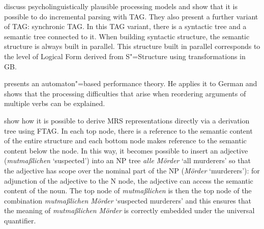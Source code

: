 \citet{SJ93a} discuss psycholinguistically plausible processing models and show that it is possible to do incremental parsing with TAG. They also present a
further variant of TAG: synchronic TAG\indexstag. In this TAG variant, there is a syntactic tree and a semantic tree connected to it.
When building syntactic structure, the semantic structure is always built in parallel. This structure built in parallel corresponds to the level of Logical
Form derived from S"=Structure using transformations in GB.


\citet[Chapter~6]{Rambow94a} presents an automaton"=based performance theory. He applies it to German and shows that
the processing difficulties that arise when reordering arguments of multiple verbs can be explained.

\citet{KR2008a-u} show how it is possible to derive MRS representations directly via a derivation tree using FTAG. In each top node, there is a reference
to the semantic content of the entire structure and each bottom node makes reference to the semantic content below the node. In this way, it becomes possible
to insert an adjective (\eg \emph{mutmaßlichen} `suspected') into an NP tree \emph{alle Mörder} `all murderers' so that the adjective has scope over
the nominal part of the NP (\emph{Mörder} `murderers'): for adjunction of the adjective to the N node, the adjective can access the semantic content of the noun.
The top node of \emph{mutmaßlichen} is then the top node of the combination \emph{mutmaßlichen Mörder} `suspected murderers' and this ensures that the meaning of \emph{mutmaßlichen Mörder}
is correctly embedded under the universal quantifier.


